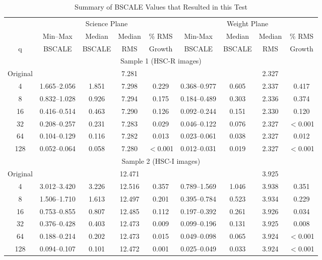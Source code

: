 \begin{table}
\caption{Summary of BSCALE Values that Resulted in this Test}
\footnotesize
\centering
\begin{tabular}[]{c|cccc|cccc}
\hline
        &  \multicolumn{4}{c}{Science Plane} & \multicolumn{4}{c}{Weight Plane} \\
        &   Min--Max & Median & Median & \% RMS  & Min-Max & Median & Median &  \% RMS \\
 q      &    BSCALE  & BSCALE &  RMS   & Growth  &  BSCALE & BSCALE & RMS    &  Growth \\
\hline
\multicolumn{9}{c}{Sample 1 (HSC-R images)}  \\
\hline
Original &             &       & 7.281  &         &              &       & 2.327 &          \\
    4   & 1.665--2.056 & 1.851 & 7.298  & 0.229 & 0.368--0.977 & 0.605 & 2.337 & 0.417  \\
    8   & 0.832--1.028 & 0.926 & 7.294  & 0.175 & 0.184--0.489 & 0.303 & 2.336 & 0.374  \\
   16   & 0.416--0.514 & 0.463 & 7.290  & 0.126 & 0.092--0.244 & 0.151 & 2.330 & 0.120  \\
   32   & 0.208--0.257 & 0.231 & 7.283  & 0.029 & 0.046--0.122 & 0.076 & 2.327 & $<$0.001  \\
   64   & 0.104--0.129 & 0.116 & 7.282  & 0.013 & 0.023--0.061 & 0.038 & 2.327 & 0.012  \\
  128   & 0.052--0.064 & 0.058 & 7.280  & $<$0.001 & 0.012--0.031 & 0.019 & 2.327 & $<$0.001  \\
\hline 
\multicolumn{9}{c}{Sample 2 (HSC-I images)}  \\
\hline
 Original &              &       & 12.471 &         &              &       & 3.925 &          \\
    4   & 3.012--3.420 & 3.226 & 12.516 & 0.357 & 0.789--1.569 & 1.046 & 3.938 & 0.351  \\
    8   & 1.506--1.710 & 1.613 & 12.497 & 0.201 & 0.395--0.784 & 0.523 & 3.934 & 0.229  \\
   16   & 0.753--0.855 & 0.807 & 12.485 & 0.112 & 0.197--0.392 & 0.261 & 3.926 & 0.034  \\
   32   & 0.376--0.428 & 0.403 & 12.473 & 0.009 & 0.099--0.196 & 0.131 & 3.925 & 0.008  \\
   64   & 0.188--0.214 & 0.202 & 12.473 & 0.015 & 0.049--0.098 & 0.065 & 3.924 & $<$0.001  \\
  128   & 0.094--0.107 & 0.101 & 12.472 & 0.001 & 0.025--0.049 & 0.033 & 3.924 & $<$0.001  \\
\hline
\end{tabular}
\label{tab_bscale}
\end{table}

